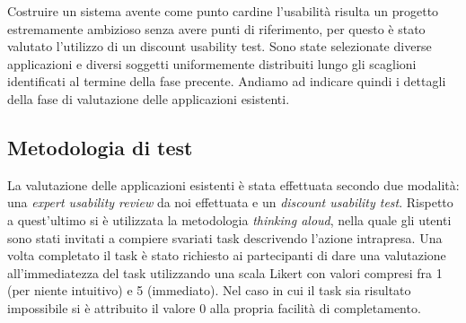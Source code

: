 Costruire un sistema avente come punto cardine l'usabilità risulta un progetto
estremamente ambizioso senza avere punti di riferimento, per questo è stato
valutato l'utilizzo di un discount usability test.  Sono state selezionate
diverse applicazioni e diversi soggetti uniformemente distribuiti lungo gli
scaglioni identificati al termine della fase precente.  Andiamo ad indicare
quindi i dettagli della fase di valutazione delle applicazioni esistenti.

\subsection{Metodologia di test}
La valutazione delle applicazioni esistenti è stata effettuata secondo due
modalità: una \emph{expert usability review} da noi effettuata e un
\emph{discount usability test}.  Rispetto a quest'ultimo si è utilizzata la
metodologia \emph{thinking aloud}, nella quale gli utenti sono stati invitati a
compiere svariati task descrivendo l'azione intrapresa.  Una volta completato il
task è stato richiesto ai partecipanti di dare una valutazione all'immediatezza
del task utilizzando una scala Likert con valori compresi fra 1 (per niente
intuitivo) e 5 (immediato).  Nel caso in cui il task sia risultato impossibile
si è attribuito il valore 0 alla propria facilità di completamento.
